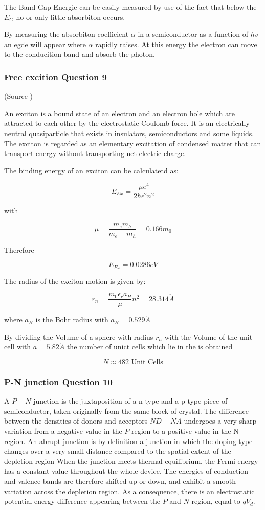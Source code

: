 The Band Gap Energie can be easily measured by use of the fact
that below the $E_G$ no or only little absorbiton occurs.

By measuring the absorbiton coefficient $\alpha$ in a 
semiconductor as a function of $hv$ an egde will appear 
where $\alpha$ rapidly raises. At this energy the electron
can move to the conducition band and absorb the photon.


\subsubsection*{Free excition Question 9}

(Source \cite[Introduction to Solid State Physics p. 312]{kittel})

An exciton is a bound state of an electron and an electron hole which are attracted to each other by the electrostatic Coulomb force. It is an electrically neutral quasiparticle that exists in insulators, semiconductors and some liquids. The exciton is regarded as an elementary excitation of condensed matter that can transport energy without transporting net electric charge.

The binding energy of an exciton can be calculatetd as:

$$E_{Ex} = \frac{\mu e^4}{2\hbar \epsilon^2 n^2}$$

with 

$$\mu = \frac{m_em_h}{m_e+m_h} = 0.166m_0$$

Therefore

$$E_{Ex} = 0.0286 eV$$

The radius of the exciton motion is given by:

$$r_n = \frac{m_0 \epsilon_r a_H}{\mu} n^2= 28.314 \mathring{A}$$

where $a_H$ is the Bohr radius with $a_H = 0.529 \mathring{A}$

By dividing the Volume of a sphere with radius $r_n$ with the Volume
of the unit cell with $a=5.82 \mathring{A}$ the number of unict 
cells which lie in the is obtained

$$N \approx 482 \textrm{ Unit Cells}$$

\subsubsection*{P-N junction Question 10}

A $P-N$ junction is the juxtaposition of a n-type and a p-type piece of semiconductor, taken originally from the same block of crystal. The difference between the densities of donors and acceptors $ND - NA$ undergoes a very sharp variation from a negative value in the $P$ region to a positive value in the N region. An abrupt junction is by definition a junction in which the doping type changes over a very small distance compared to the spatial extent of the depletion region
When the junction meets thermal equilibrium, the Fermi energy has a constant value throughout the whole device. The energies of conduction and valence bands are therefore shifted up or down, and exhibit a smooth variation across the depletion region. As a consequence, there is an electrostatic potential energy difference appearing between the $P$ and $N$ region, equal to $qV_d$.

